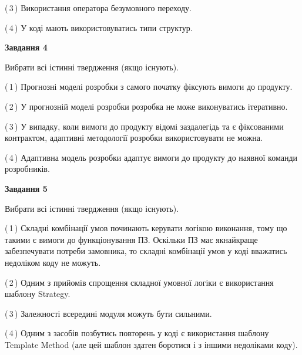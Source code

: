\documentclass[10pt, ukrainian]{article}
\begin{document}
{\begin {large}
(\,3\,) Використання оператора безумовного переходу. %



(\,4\,) У коді мають використовуватись типи структур. %


{\begin {center}\textbf{Завдання 4}\end {center}}\par
Вибрати всі істинні твердження (якщо існують).\par
\vspace{2mm}



(\,1\,) Прогнозні моделі розробки з самого початку фіксують вимоги до продукту. %



(\,2\,) У прогнозній моделі розробки розробка не може виконуватись ітеративно. %



(\,3\,) У випадку, коли вимоги до продукту відомі заздалегідь та є фіксованими контрактом, адаптивні методології розробки використовувати не можна. %



(\,4\,) Адаптивна модель розробки адаптує вимоги до продукту до наявної команди розробників. %


{\begin {center}\textbf{Завдання 5}\end {center}}\par
Вибрати всі істинні твердження (якщо існують).\par
\vspace{2mm}



(\,1\,) Складні комбінації умов починають керувати логікою виконання, тому що такими є вимоги до функціонування ПЗ. Оскільки ПЗ має якнайкраще забезпечувати потреби замовника, то складні комбінації умов у коді вважатись недоліком коду не можуть. %



(\,2\,) Одним з прийомів спрощення складної умовної логіки є використання шаблону Strategy. %



(\,3\,) Залежності всередині модуля можуть бути сильними. %



(\,4\,) Одним з засобів позбутись повторень у коді є використання шаблону Template Method (але цей шаблон здатен боротися і з іншими недоліками коду). %


\end{large}}
\end{document}
